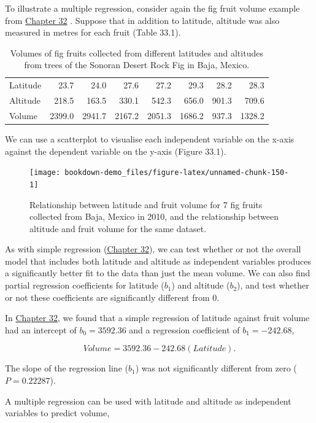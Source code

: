 \documentclass[
  openany]{scrbook}
\begin{document}
To illustrate a multiple regression, consider again the fig fruit volume example from \protect\hyperlink{Chapter_32}{Chapter 32} \citep{Duthie2016}.
Suppose that in addition to latitude, altitude was also measured in metres for each fruit (Table 33.1).

\begin{longtable}[]{@{}lrrrrrrr@{}}
\caption{\label{tab:unnamed-chunk-149}Volumes of fig fruits collected from different latitudes and altitudes from trees of the Sonoran Desert Rock Fig in Baja, Mexico.}\tabularnewline
\toprule
\endhead
Latitude & 23.7 & 24.0 & 27.6 & 27.2 & 29.3 & 28.2 & 28.3 \\
Altitude & 218.5 & 163.5 & 330.1 & 542.3 & 656.0 & 901.3 & 709.6 \\
Volume & 2399.0 & 2941.7 & 2167.2 & 2051.3 & 1686.2 & 937.3 & 1328.2 \\
\bottomrule
\end{longtable}

We can use a scatterplot to visualise each independent variable on the x-axis against the dependent variable on the y-axis (Figure 33.1).

\begin{figure}
\texttt{[image: bookdown-demo\_files/figure-latex/unnamed-chunk-150-1]} \caption{Relationship between latitude and fruit volume for 7 fig fruits collected from Baja, Mexico in 2010, and the relationship between altitude and fruit volume for the same dataset. }\label{fig:unnamed-chunk-150}
\end{figure}

As with simple regression (\protect\hyperlink{Chapter_32}{Chapter 32}), we can test whether or not the overall model that includes both latitude and altitude as independent variables produces a significantly better fit to the data than just the mean volume.
We can also find partial regression coefficients for latitude (\(b_{1}\)) and altitude (\(b_{2}\)), and test whether or not these coefficients are significantly different from 0.

In \protect\hyperlink{Chapter_32}{Chapter 32}, we found that a simple regression of latitude against fruit volume had an intercept of \(b_{0} = 3592.36\) and a regression coefficient of \(b_{1} = -242.68\),

\[Volume = 3592.36 - 242.68(Latitude).\]

The slope of the regression line (\(b_{1}\)) was not significantly different from zero (\(P = 0.22287\)).

A multiple regression can be used with latitude and altitude as independent variables to predict volume,
\end{document}
